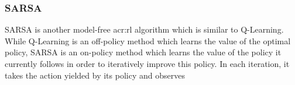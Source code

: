 \subsubsection{SARSA}
\label{sec:sarsa}

SARSA is another model-free \acrshort{acr:rl} algorithm which is similar to Q-Learning.
While Q-Learning is an off-policy method which learns the value of the optimal policy, SARSA is an on-policy method which learns the value of the policy it currently follows in order to iteratively improve this policy.
In each iteration, it takes the action yielded by its policy and observes

%
\vspace{12pt}
\noindent{}
%